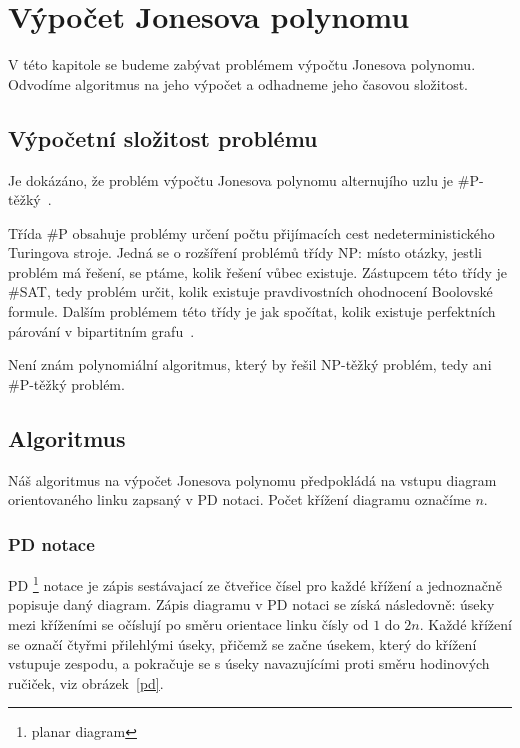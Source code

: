\chapter{Výpočet Jonesova polynomu}

V této kapitole se budeme zabývat problémem výpočtu Jonesova polynomu. Odvodíme algoritmus na jeho výpočet a odhadneme jeho časovou složitost.

\section{Výpočetní složitost problému} 

Je dokázáno, že problém výpočtu Jonesova polynomu alternujího uzlu je \mbox{\#P-těžký}~\cite{jaeger_vertigan_welsh_1990}. 

Třída \#P obsahuje problémy určení počtu přijímacích cest nedeterministického Turingova stroje. Jedná se o rozšíření problémů třídy NP: místo otázky, jestli problém má řešení, se ptáme, kolik řešení vůbec existuje. Zástupcem této třídy je \#SAT, tedy problém určit, kolik existuje pravdivostních ohodnocení Boolovské formule. Dalším problémem této třídy je jak spočítat, kolik  existuje perfektních párování v bipartitním grafu~\cite{zoo}.

Není znám polynomiální algoritmus, který by řešil NP-těžký problém, tedy ani \#P-těžký problém.

\section{Algoritmus}
Náš algoritmus na výpočet Jonesova polynomu předpokládá na vstupu diagram orientovaného linku zapsaný v PD notaci. Počet křížení diagramu označíme $n$.

\subsection{PD notace} 

PD \footnote{planar diagram} notace je zápis sestávajací ze čtveřice čísel pro každé křížení a jednoznačně popisuje daný diagram. Zápis diagramu v PD notaci se získá následovně: úseky mezi kříženími se očíslují po směru orientace linku čísly od $1$ do $2 n$. Každé křížení se označí čtyřmi přilehlými úseky, přičemž se začne úsekem, který do křížení vstupuje zespodu, a pokračuje se s úseky navazujícími proti směru hodinových ručiček, viz obrázek~\ref{pd}.

